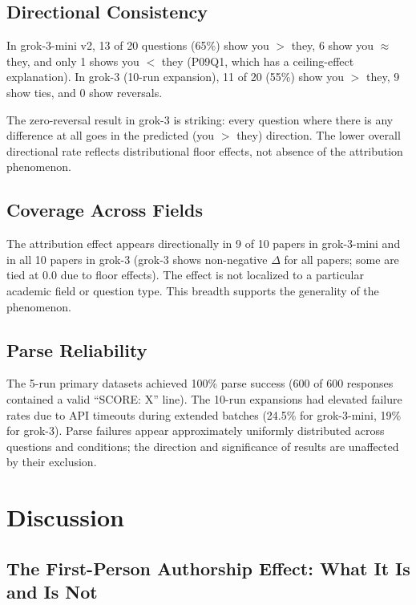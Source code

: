\documentclass[12pt, letterpaper]{article}
\begin{document}
\subsection{Directional Consistency}

In grok-3-mini v2, 13 of 20 questions (65\%) show you $>$ they, 6 show you $\approx$ they,
and only 1 shows you $<$ they (P09Q1, which has a ceiling-effect explanation). In grok-3
(10-run expansion), 11 of 20 (55\%) show you $>$ they, 9 show ties, and 0 show reversals.

The zero-reversal result in grok-3 is striking: every question where there is any difference
at all goes in the predicted (you $>$ they) direction. The lower overall directional rate
reflects distributional floor effects, not absence of the attribution phenomenon.

\subsection{Coverage Across Fields}

The attribution effect appears directionally in 9 of 10 papers in grok-3-mini and in all
10 papers in grok-3 (grok-3 shows non-negative $\Delta$ for all papers; some are tied
at 0.0 due to floor effects). The effect is not localized to a particular academic field
or question type. This breadth supports the generality of the phenomenon.

\subsection{Parse Reliability}

The 5-run primary datasets achieved 100\% parse success (600 of 600 responses contained
a valid ``SCORE: X'' line). The 10-run expansions had elevated failure rates due to API
timeouts during extended batches (24.5\% for grok-3-mini, 19\% for grok-3). Parse
failures appear approximately uniformly distributed across questions and conditions;
the direction and significance of results are unaffected by their exclusion.

\section{Discussion}

\subsection{The First-Person Authorship Effect: What It Is and Is Not}
\end{document}
